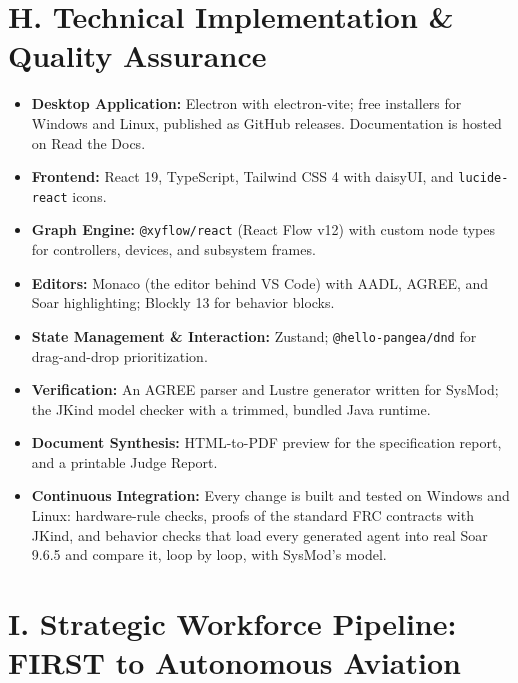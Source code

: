 \documentclass[11pt,letterpaper]{article}
\begin{document}
\needspace{6cm}
\section*{\Large {H. Technical Implementation \& Quality Assurance}}\label{sec:H}
\begin{itemize}
    \item \textbf{Desktop Application:} Electron with electron-vite; free installers for Windows and Linux, published as GitHub releases. Documentation is hosted on Read the Docs.
    \item \textbf{Frontend:} React 19, TypeScript, Tailwind CSS 4 with daisyUI, and \texttt{lucide-react} icons.
    \item \textbf{Graph Engine:} \texttt{@xyflow/react} (React Flow v12) with custom node types for controllers, devices, and subsystem frames.
    \item \textbf{Editors:} Monaco (the editor behind VS Code) with AADL, AGREE, and Soar highlighting; Blockly 13 for behavior blocks.
    \item \textbf{State Management \& Interaction:} Zustand; \texttt{@hello-pangea/dnd} for drag-and-drop prioritization.
    \item \textbf{Verification:} An AGREE parser and Lustre generator written for SysMod; the JKind model checker with a trimmed, bundled Java runtime.
    \item \textbf{Document Synthesis:} HTML-to-PDF preview for the specification report, and a printable Judge Report.
    \item \textbf{Continuous Integration:} Every change is built and tested on Windows and Linux: hardware-rule checks, proofs of the standard FRC contracts with JKind, and behavior checks that load every generated agent into real Soar 9.6.5 and compare it, loop by loop, with SysMod's model.
\end{itemize}

\needspace{8cm}
\section*{\Large {I. Strategic Workforce Pipeline: FIRST to Autonomous Aviation}}\label{sec:I}
\end{document}
